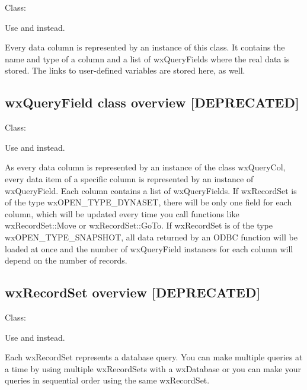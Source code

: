 Class: 


Use  and  instead.

Every data column is represented by an instance of this class.
It contains the name and type of a column and a list of wxQueryFields where
the real data is stored. The links to user-defined variables are stored
here, as well.



\subsection{wxQueryField class overview [DEPRECATED]}\label{wxqueryfieldoverview}

Class: 


Use  and  instead.

As every data column is represented by an instance of the class wxQueryCol,
every data item of a specific column is represented by an instance of
wxQueryField. Each column contains a list of wxQueryFields. If wxRecordSet is
of the type wxOPEN\_TYPE\_DYNASET, there will be only one field for each column,
which will be updated every time you call functions like wxRecordSet::Move
or wxRecordSet::GoTo. If wxRecordSet is of the type wxOPEN\_TYPE\_SNAPSHOT,
all data returned by an ODBC function will be loaded at once and the number
of wxQueryField instances for each column will depend on the number of records.



\subsection{wxRecordSet overview [DEPRECATED]}\label{wxrecordsetoverview}

Class: 


Use  and  instead.


Each wxRecordSet represents a database query. You can make multiple queries
at a time by using multiple wxRecordSets with a wxDatabase or you can make
your queries in sequential order using the same wxRecordSet.

